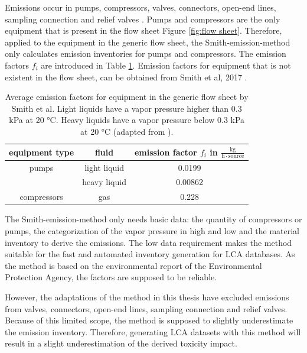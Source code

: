 Emissions occur in pumps, compressors, valves, connectors, open-end lines, sampling connection and relief valves \cite{Smith.2017}. Pumps and compressors are the only equipment that is present in the flow sheet Figure \ref{fig:flow sheet}. Therefore, applied to the equipment in the generic flow sheet, the Smith-emission-method only calculates emission inventories for pumps and compressors. The emission factors $f_i$ are introduced in Table \ref{tab:emissionSmith}. Emission factors for equipment that is not existent in the flow sheet, can be obtained from Smith et al, 2017 \cite{Smith.2017}.

\begin{table}[h]
\caption[Average emission factors for equipment in the generic flow sheet by Smith et al.]{Average emission factors for equipment in the generic flow sheet by Smith et al. Light liquids have a vapor pressure higher than 0.3 kPa at 20 °C. Heavy liquids have a vapor pressure below 0.3 kPa at 20 °C (adapted from  \cite{U.S.EnvironmentalProtectionAgency.1995,Smith.2017}).}
\label{tab:emissionSmith}
\centering
\begin{tabular}{ccc}
\toprule
\textbf{equipment type} & \textbf{fluid} & \textbf{emission factor $f_i$ in $\frac{\mathrm{kg}}{\mathrm{h}\cdot \mathrm{source}}$} \\ \midrule
pumps & light liquid & 0.0199\\\
{}& heavy liquid & 0.00862\\
compressors & gas & 0.228\\\bottomrule
\end{tabular}
    
\end{table}

The Smith-emission-method only needs basic data: the quantity of compressors or pumps, the categorization of the vapor pressure in high and low and the material inventory to derive the emissions. The low data requirement makes the method suitable for the fast and automated inventory generation for LCA databases. As the method is based on the environmental report of the Environmental Protection Agency, the factors are supposed to be reliable. 

However, the adaptations of the method in this thesis have excluded emissions from valves, connectors, open-end lines, sampling connection and relief valves. %
Because of this limited scope, the method is supposed to slightly underestimate the emission inventory. Therefore, generating LCA datasets with this method will result in a slight underestimation of the derived toxicity impact.

